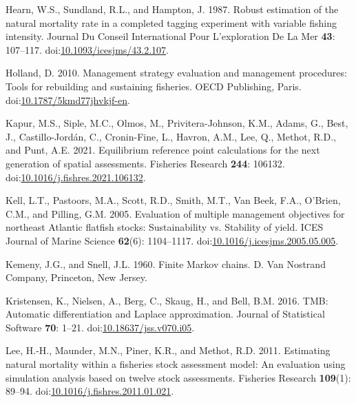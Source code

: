 \documentclass[
]{article}
\newlength{\cslhangindent}
\newlength{\cslentryspacingunit} %
\newenvironment{CSLReferences}[2] %
 {%
  \setlength{\parindent}{0pt}
  \ifodd #1
  \let\oldpar\par
  \def\par{\hangindent=\cslhangindent\oldpar}
  \fi
  \setlength{\parskip}{#2\cslentryspacingunit}
 }%
 {}
\begin{document}
\begin{CSLReferences}{1}{0}
\leavevmode{}%
Hearn, W.S., Sundland, R.L., and Hampton, J. 1987. Robust estimation of the natural mortality rate in a completed tagging experiment with variable fishing intensity. Journal Du Conseil International Pour L'exploration De La Mer \textbf{43}: 107--117. doi:\href{https://doi.org/10.1093/icesjms/43.2.107}{10.1093/icesjms/43.2.107}.

\leavevmode{}%
Holland, D. 2010. Management strategy evaluation and management procedures: Tools for rebuilding and sustaining fisheries. OECD Publishing, Paris. doi:\href{https://doi.org/10.1787/5kmd77jhvkjf-en}{10.1787/5kmd77jhvkjf-en}.

\leavevmode{}%
Kapur, M.S., Siple, M.C., Olmos, M., Privitera-Johnson, K.M., Adams, G., Best, J., Castillo-Jordán, C., Cronin-Fine, L., Havron, A.M., Lee, Q., Methot, R.D., and Punt, A.E. 2021. Equilibrium reference point calculations for the next generation of spatial assessments. Fisheries Research \textbf{244}: 106132. doi:\href{https://doi.org/10.1016/j.fishres.2021.106132}{10.1016/j.fishres.2021.106132}.

\leavevmode{}%
Kell, L.T., Pastoors, M.A., Scott, R.D., Smith, M.T., Van Beek, F.A., O'Brien, C.M., and Pilling, G.M. 2005. Evaluation of multiple management objectives for northeast {A}tlantic flatfish stocks: Sustainability vs. Stability of yield. ICES Journal of Marine Science \textbf{62}(6): 1104--1117. doi:\href{https://doi.org/10.1016/j.icesjms.2005.05.005}{10.1016/j.icesjms.2005.05.005}.

\leavevmode{}%
Kemeny, J.G., and Snell, J.L. 1960. Finite {M}arkov chains. D. Van Nostrand Company, Princeton, New Jersey.

\leavevmode{}%
Kristensen, K., Nielsen, A., Berg, C., Skaug, H., and Bell, B.M. 2016. {TMB}: Automatic differentiation and {Laplace} approximation. Journal of Statistical Software \textbf{70}: 1--21. doi:\href{https://doi.org/10.18637/jss.v070.i05}{10.18637/jss.v070.i05}.

\leavevmode{}%
Lee, H.-H., Maunder, M.N., Piner, K.R., and Methot, R.D. 2011. Estimating natural mortality within a fisheries stock assessment model: An evaluation using simulation analysis based on twelve stock assessments. Fisheries Research \textbf{109}(1): 89--94. doi:\href{https://doi.org/10.1016/j.fishres.2011.01.021}{10.1016/j.fishres.2011.01.021}.


\end{CSLReferences}
\end{document}
